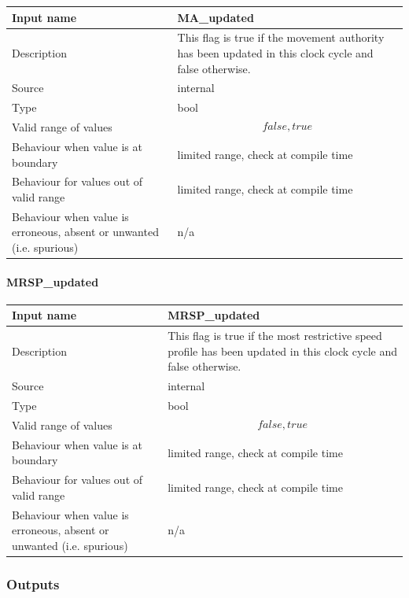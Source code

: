 \begin{longtable}{p{}p{}}
\toprule
Input name				& MA\_updated \\
\midrule
Description				& This flag is true if the movement authority has been updated in this clock cycle and false otherwise. \\
\midrule
Source					& internal \\ 
\midrule
Type					& bool \\
\midrule
Valid range of values	& \[false, true\] \\
\midrule
Behaviour when value is at boundary	& limited range, check at compile time \\
\midrule
Behaviour for values out of valid range	& limited range, check at compile time \\
\midrule
Behaviour when value is erroneous, absent or unwanted (i.e. spurious) & n/a \\
\bottomrule
\end{longtable}


\paragraph{MRSP\_updated}

\begin{longtable}{p{}p{}}
\toprule
Input name				& MRSP\_updated \\
\midrule
Description				& This flag is true if the most restrictive speed profile has been updated in this clock cycle and false otherwise. \\
\midrule
Source					& internal \\ 
\midrule
Type					& bool \\
\midrule
Valid range of values	& \[false, true\] \\
\midrule
Behaviour when value is at boundary	& limited range, check at compile time \\
\midrule
Behaviour for values out of valid range	& limited range, check at compile time \\
\midrule
Behaviour when value is erroneous, absent or unwanted (i.e. spurious) & n/a \\
\bottomrule
\end{longtable}


\subsubsection{Outputs}\label{s:SDM_outputs}

